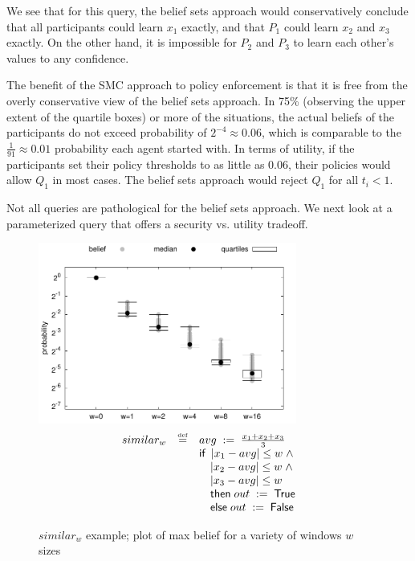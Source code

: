 \documentclass[10pt]{sigplanconf}
\begin{document}
We see that for this query, the belief sets approach would
conservatively conclude that all participants could learn $ x_1 $
exactly, and that $ P_1 $ could learn $ x_2 $ and $ x_3 $ exactly. On
the other hand, it is impossible for $ P_2 $ and $ P_3 $ to learn each
other's values to any confidence.

The benefit of the SMC approach to policy enforcement is that it is
free from the overly conservative view of the belief sets approach. In
75\% (observing the upper extent of the quartile boxes) or more of the
situations, the actual beliefs of the participants do not exceed
probability of $ 2^{-4} \approx 0.06 $, which is comparable to the
$ \frac{1}{91} \approx 0.01 $ probability each agent started with. In
terms of utility, if the participants set their policy thresholds to
as little as 0.06, their policies would allow $ Q_1 $ in most
cases. The belief sets approach would reject $ Q_1 $ for all $t_i < 1$.

Not all queries are pathological for the belief sets approach. We next
look at a parameterized query that offers a security vs. utility tradeoff.

\begin{figure}[t]
\centering \includegraphics[width=8.5cm]{figures/beliefs_similar.pdf}
$$ \begin{array}{lcl}
similar_w & \stackrel{\smash{\scriptscriptstyle \mathrm{def}}}= & {avg}\;:=\;{\frac{x_1+x_2+x_3}{3}} \\
&& \mathsf{if}\; \left| x_1 - avg \right| \leq w \; \wedge \\
&& \quad   \left| x_2 - avg \right| \leq w \; \wedge \\
&& \quad   \left| x_3 - avg \right| \leq w \\
&& \quad \mathsf{then}\;{out}\;:=\;{\mathsf{True}} \\
&& \quad \mathsf{else}\; {out}\;:=\;{\mathsf{False}}
\end{array} $$
\vspace*{-0.1in}
\caption{$ similar_{w} $ example; plot of max belief for a variety of
windows $ w $ sizes} \label{fig:similar}
\vspace*{-0.1in}
\end{figure}
\end{document}
